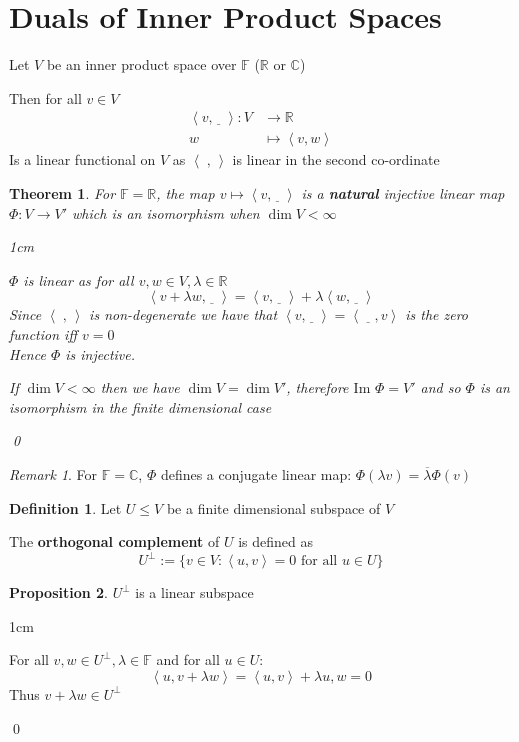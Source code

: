 \documentclass[11pt, a4paper]{report}
\makeatletter
\numberwithin{equation}{section}
\newcommand{\R}{\mathbb{R}}
\newcommand{\C}{\mathbb{C}}
\newcommand{\F}{\mathbb{F}}
\newcommand{\blnk}{\underline{\;\;}\,}
\newcommand{\alnk}{\,\underline{\;\;}\,}
\newcommand{\spn}[1]{\left\langle #1 \right\rangle}
\newcommand{\spb}{\spn{\;,\,}}
\newcommand{\im}{\text{Im }}
\numberwithin{equation}{subsection}
\theoremstyle{plain}
\newtheorem{thm}{Theorem}[chapter] %
\theoremstyle{definition}
\newtheorem{defn}{Definition}[chapter]
\newtheorem{prop}[thm]{Proposition}
\theoremstyle{remark}
\newtheorem*{rem}{Remark}
\newtheorem*{prf}{Proof}
\renewenvironment{prf}[1][\proofname]{\par
  \vspace{-\topsep}%
  \normalfont
  \topsep0pt \partopsep0pt %
  \trivlist
  \item[\hskip\labelsep
        \itshape
    #1\@addpunct{.}]\ignorespaces
}{%
  \popQED\endtrivlist\@endpefalse
  \addvspace{6pt plus 6pt} %
}
\newcommand{\pr}[1]{\begin{adjustwidth}{1cm}{} \begin{prf} #1 \end{prf} \end{adjustwidth}}
\makeatother
\begin{document}
\newpage
\section{Duals of Inner Product Spaces}

Let $V$ be an inner product space over $\F$ ($\R$ or $\C$)

Then for all $v \in V$
\begin{align*}
\spn{v,\underline{\;\;}\,} : V &\to \R\\
						w &\mapsto \spn{v,w}
\end{align*}
Is a linear functional on $V$ as $\spb$ is linear in the second co-ordinate

\begin{thm}
For $\F = \R$, the map $v \mapsto \spn{v, \underline{\;\;}\,}$ is a \textbf{natural} injective linear map $\Phi: V \to V'$ which is an isomorphism when $\dim V < \infty$

\pr{
$\Phi$ is linear as for all $v,w \in V, \lambda \in \R$
$$\spn{v + \lambda w, \blnk} = \spn{v, \blnk} + \lambda \spn{w, \blnk}$$
Since $\spb$ is non-degenerate we have that $\spn{v, \blnk} = \spn{ \alnk, v}$ is the zero function iff $v = 0$\\ Hence $\Phi$ is injective.

If $\dim V < \infty$ then we have $\dim V = \dim V'$, therefore $\im \Phi = V'$ and so $\Phi$ is an isomorphism in the finite dimensional case
}\qed
\end{thm}

\begin{rem} 
For $\F = \C$, $\Phi$ defines a conjugate linear map: $\Phi(\lambda v) = \overline{\lambda}\Phi(v)$
\end{rem}

\begin{defn}
Let $U \leq V$ be a finite dimensional subspace of $V$

The \textbf{orthogonal complement} of $U$ is defined as
$$U^\perp := \{ v \in V : \spn{u,v} = 0 \text{ for all } u \in U \}$$

\end{defn}

\begin{prop}
$U^\perp$ is a linear subspace

\pr{
For all $v, w \in U^\perp, \lambda \in \F$ and for all $u \in U$:
$$\spn{u, v + \lambda w} = \spn{u, v} + \lambda{u,w} = 0$$
Thus $v + \lambda w \in U^\perp$
}\qed
\end{prop}
\end{document}
